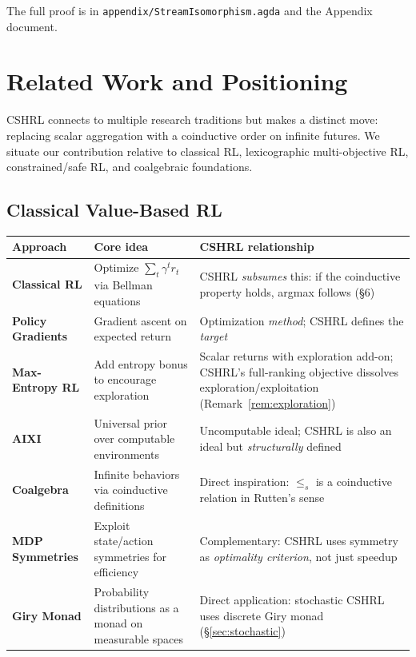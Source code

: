 \documentclass[9pt,a4paper]{article}
\newcommand{\fpath}[1]{\nolinkurl{#1}}
\theoremstyle{plain}
\theoremstyle{definition}
\theoremstyle{remark}
\begin{document}
\noindent The full proof is in \fpath{appendix/StreamIsomorphism.agda} and the Appendix document.

\section{Related Work and Positioning}

CSHRL connects to multiple research traditions but makes a distinct move: replacing scalar aggregation with a coinductive order on infinite futures. We situate our contribution relative to classical RL, lexicographic multi-objective RL, constrained/safe RL, and coalgebraic foundations.

\subsection{Classical Value-Based RL}

\begin{table}[H]
\centering
\small
\renewcommand{\arraystretch}{1.2}
\begin{tabularx}{\textwidth}{|>{\raggedright\arraybackslash}p{}|>{\raggedright\arraybackslash}X|>{\raggedright\arraybackslash}X|}
\hline
\textbf{Approach} & \textbf{Core idea} & \textbf{CSHRL relationship} \\
\hline
\textbf{Classical RL} \cite{Sutton2018} & Optimize $\sum_t \gamma^t r_t$ via Bellman equations & CSHRL \emph{subsumes} this: if the coinductive property holds, argmax follows (\S6) \\
\hline
\textbf{Policy Gradients} \cite{Williams1992} & Gradient ascent on expected return & Optimization \emph{method}; CSHRL defines the \emph{target} \\
\hline
\textbf{Max-Entropy RL} \cite{Haarnoja2018} & Add entropy bonus to encourage exploration & Scalar returns with exploration add-on; CSHRL's full-ranking objective dissolves exploration/exploitation (Remark~\ref{rem:exploration}) \\
\hline
\textbf{AIXI} \cite{Hutter2005} & Universal prior over computable environments & Uncomputable ideal; CSHRL is also an ideal but \emph{structurally} defined \\
\hline
\textbf{Coalgebra} \cite{Rutten2000} & Infinite behaviors via coinductive definitions & Direct inspiration: $\le_s$ is a coinductive relation in Rutten's sense \\
\hline
\textbf{MDP Symmetries} \cite{vanderPol2020} & Exploit state/action symmetries for efficiency & Complementary: CSHRL uses symmetry as \emph{optimality criterion}, not just speedup \\
\hline
\textbf{Giry Monad} \cite{Giry1982} & Probability distributions as a monad on measurable spaces & Direct application: stochastic CSHRL uses discrete Giry monad (\S\ref{sec:stochastic}) \\
\hline
\end{tabularx}
\end{table}
\end{document}

